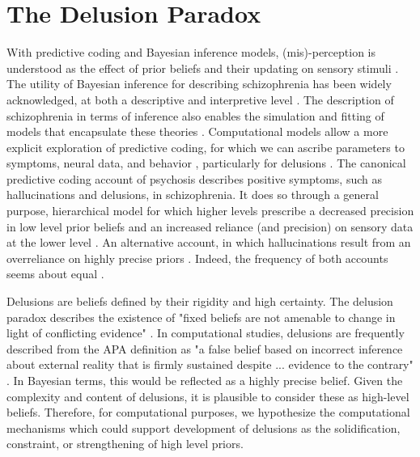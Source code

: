 \documentclass{article}
\begin{document}
\section{The Delusion Paradox}\label{delusion_paradox}

With predictive coding and Bayesian inference models, (mis)-perception is understood as the effect of prior beliefs and their updating on sensory stimuli \citep{hohwy2013predictive}. The utility  of Bayesian inference for describing schizophrenia has been widely acknowledged, at both a descriptive 
\citep{Hemsley1986formation, bongiorno2025delusions, sterzer2018predictive, corlett2019hallucinations, sterzer2019decision, notredame2014what} and interpretive level \citep{horga2019integrative, horga2014deficits}. The description of schizophrenia in terms of inference also enables the simulation and fitting of models that encapsulate these theories \citep{ashinoff2022rethinking, adams2013computational, gibbs-dean2023belief, fromm2023belief, katthagen2018modeling}. Computational models allow a more explicit exploration of predictive coding, for which we can ascribe parameters to symptoms, neural data, and behavior \citep{friston2023computational, adams2017computational}, particularly for delusions \citep{corlett2010towards}. The canonical predictive coding account of psychosis describes positive symptoms, such as hallucinations and delusions, in schizophrenia. It does so through a general purpose, hierarchical model for which higher levels prescribe a decreased precision in low level prior beliefs and an increased reliance (and precision) on sensory data at the lower level \citep{sterzer2018predictive}. An alternative account, in which hallucinations result from an overreliance on highly precise priors \citep{corlett2019hallucinations}. Indeed, the frequency of both accounts seems about equal \citep{goodwin2023predictive}. 

Delusions are beliefs defined by their rigidity and high certainty. The delusion paradox describes the existence of "fixed beliefs are not amenable to change in light of conflicting evidence" \citep{APA2013}. In computational studies, delusions are frequently described from the APA definition as "a false belief based on incorrect inference about external reality that is firmly sustained despite ... evidence to the contrary" . In Bayesian terms, this would be reflected as a highly precise belief. Given the complexity and content of delusions, it is plausible to consider these as high-level beliefs. Therefore, for computational purposes, we hypothesize the computational mechanisms which could support development of delusions as the solidification, constraint, or strengthening of high level priors.
\end{document}
